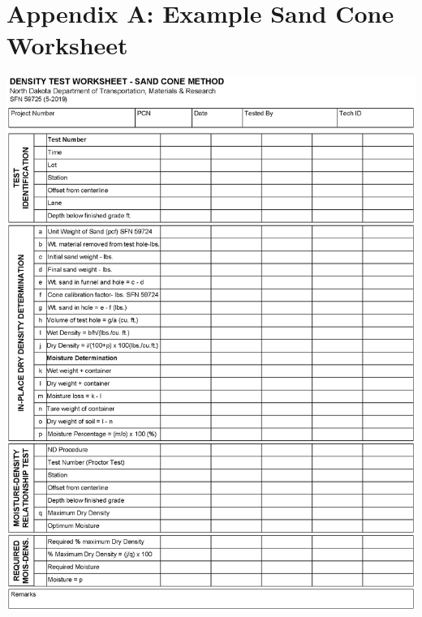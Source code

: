 \documentclass[12pt]{article}
\begin{document}
\section*{Appendix A: Example Sand Cone Worksheet}
\label{AppendixA}
\begin{center}
    \includegraphics[width=1\linewidth]{sfn59725.eps}
\end{center}

\end{document}
